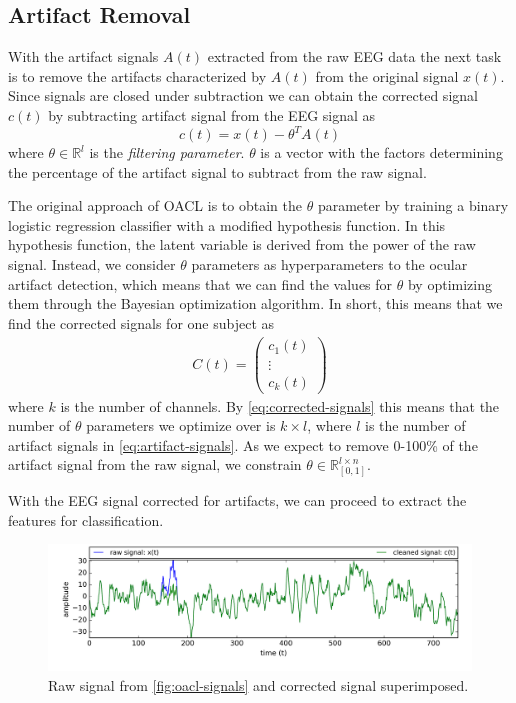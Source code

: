 \subsection{Artifact Removal}
With the artifact signals $A(t)$ extracted from the raw EEG data the next task is to remove the artifacts characterized by $A(t)$ from the original signal $x(t)$. Since signals are closed under subtraction we can obtain the corrected signal $c(t)$ by subtracting artifact signal from the EEG signal as
\begin{equation}\label{eq:corrected-signal}
c(t) = x(t) - \theta^T A(t)
\end{equation}
where $\theta \in \mathbb{R}^{l}$ is the \emph{filtering parameter}. $\theta$ is a vector with the factors determining the percentage of the artifact signal to subtract from the raw signal. 

The original approach of OACL is to obtain the $\theta$ parameter by training a binary logistic regression classifier with a modified hypothesis function. In this hypothesis function, the latent variable is derived from the power of the raw signal. Instead, we consider $\theta$ parameters as hyperparameters to the ocular artifact detection, which means that we can find the values for $\theta$ by optimizing them through the Bayesian optimization algorithm. In short, this means that we find the corrected signals for one subject as
\begin{align}\label{eq:corrected-signals}
C(t)=  \begin{pmatrix}
c_1(t) \\
\vdots  \\
c_{k}(t) 
\end{pmatrix}
\end{align}
where $k$ is the number of channels. By \cref{eq:corrected-signals} this means that the number of $\theta$ parameters we optimize over is $k \times l$, where $l$ is the number of artifact signals in \cref{eq:artifact-signals}. As we expect to remove 0-100\% of the artifact signal from the raw signal, we constrain $\theta \in \mathbb{R}^{l\times n}_{[0,1]}$.

With the EEG signal corrected for artifacts, we can proceed to extract the features for classification.
\begin{figure}%
	\centering
	\includegraphics[width=1\textwidth]{figures/cleaned-oacl-signal.png}
	\vspace{-2em}
	\caption{Raw signal from \cref{fig:oacl-signals} and corrected signal superimposed.}
	\label{fig:cleaned-oacl-signals}
\end{figure}